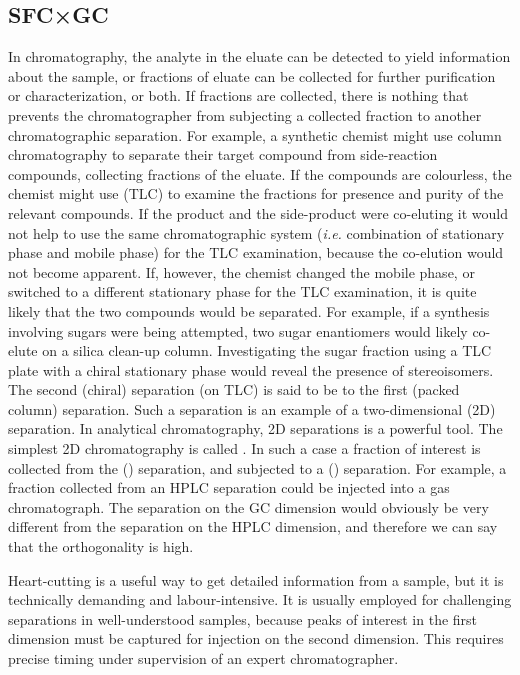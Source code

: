 \subsection{SFC×GC}
\label{sec:SFCxGC}
In chromatography, the analyte in the eluate can be detected to yield
information about the sample, or fractions of eluate can be collected for
further purification or characterization, or both. If fractions are collected,
there is nothing that prevents the chromatographer from subjecting a collected
fraction to another chromatographic separation. For example, a synthetic chemist
might use column chromatography to separate their target compound from
side-reaction compounds, collecting fractions of the eluate. If the compounds
are colourless, the chemist might use  (TLC)
to examine the fractions for presence and purity of the relevant compounds. If
the product and the side-product were co-eluting it would not help to use the
same chromatographic system (\textit{i.e.} combination of stationary phase and
mobile phase) for the TLC examination, because the co-elution would not become
apparent. If, however, the chemist changed the mobile phase, or switched to a
different stationary phase for the TLC examination, it is quite likely that the
two compounds would be separated. For example, if a synthesis involving sugars
were being attempted, two sugar enantiomers would likely co-elute on a silica
clean-up column. Investigating the sugar fraction using a TLC plate with a
chiral stationary phase would reveal the presence of stereoisomers. The second
(chiral) separation (on TLC) is said to be  to the first
(packed column) separation. Such a separation is an example of a two-dimensional
(2D) separation. In analytical chromatography, 2D separations is a powerful
tool. The simplest 2D chromatography is called . In such
a case a fraction of interest is collected from the 
(\oneD) separation, and subjected to a  (\twoD)
separation. For example, a fraction collected from an HPLC separation could be
injected into a gas chromatograph. The separation on the GC dimension would
obviously be very different from the separation on the HPLC dimension, and
therefore we can say that the orthogonality is high.

Heart-cutting is a useful way to get detailed information from a sample, but it
is technically demanding and labour-intensive. It is usually employed for
challenging separations in well-understood samples, because peaks of interest in
the first dimension must be captured for injection on the second dimension. This
requires precise timing under supervision of an expert chromatographer.

